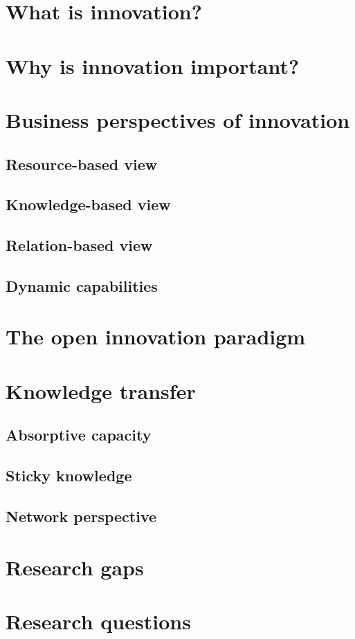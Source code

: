 

\section{What is innovation?}

\section{Why is innovation important?}

\section{Business perspectives of innovation}

\subsection{Resource-based view}

\subsection{Knowledge-based view}

\subsection{Relation-based view}

\subsection{Dynamic capabilities}

\section{The open innovation paradigm}

\section{Knowledge transfer}

\subsection{Absorptive capacity}

\subsection{Sticky knowledge}

\subsection{Network perspective}

\section{Research gaps}

\section{Research questions}